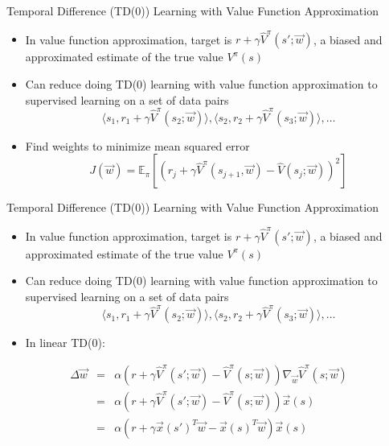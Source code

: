 \documentclass[aspectratio=169]{../latex_main/tntbeamer}  %
\begin{document}
\begin{frame}[c]{Temporal Difference (TD(0)) Learning with Value
		Function Approximation}
	
	\begin{itemize}
		\item In value function approximation, target is $r + \gamma \hat{V}^\pi (s'; \vec{w})$, a biased and approximated estimate of the true value $V^\pi(s)$
		\item Can reduce doing TD(0) learning with value function approximation to supervised learning on a set of data pairs
		$$\langle  s_1, r_1+ \gamma \hat{V}^\pi (s_2; \vec{w}) \rangle, \langle  s_2, r_2+ \gamma \hat{V}^\pi (s_3; \vec{w}) \rangle, \ldots $$
		\item Find weights to minimize mean squared error
		$$J(\vec{w}) = \mathbb{E}_\pi [(r_j + \gamma \hat{V}^\pi(s_{j+1}, \vec{w}) - \hat{V}(s_j;\vec{w}))^2]$$
	\end{itemize}
	
\end{frame}
\begin{frame}[c]{Temporal Difference (TD(0)) Learning with Value
		Function Approximation}
	
	\begin{itemize}
		\item In value function approximation, target is $r + \gamma \hat{V}^\pi (s'; \vec{w})$, a biased and approximated estimate of the true value $V^\pi(s)$
		\item Can reduce doing TD(0) learning with value function approximation to supervised learning on a set of data pairs
		$$\langle  s_1, r_1+ \gamma \hat{V}^\pi (s_2; \vec{w}) \rangle, \langle  s_2, r_2+ \gamma \hat{V}^\pi (s_3; \vec{w}) \rangle, \ldots $$
		\item In linear TD(0):
	\end{itemize}

\begin{eqnarray}
\Delta \vec{w} &=& \alpha( r + \gamma \hat{V}^\pi(s'; \vec{w}) - \hat{V}^\pi(s;\vec{w})) \nabla_\vec{w} \hat{V}^\pi (s;\vec{w})\nonumber\\
&=& \alpha( r + \gamma \hat{V}^\pi(s'; \vec{w}) - \hat{V}^\pi(s;\vec{w})) \vec{x}(s)\nonumber\\
&=& \alpha( r + \gamma \vec{x}(s')^T \vec{w} - \vec{x}(s)^T\vec{w}) \vec{x}(s)\nonumber
\end{eqnarray}
	
\end{frame}
\end{document}
